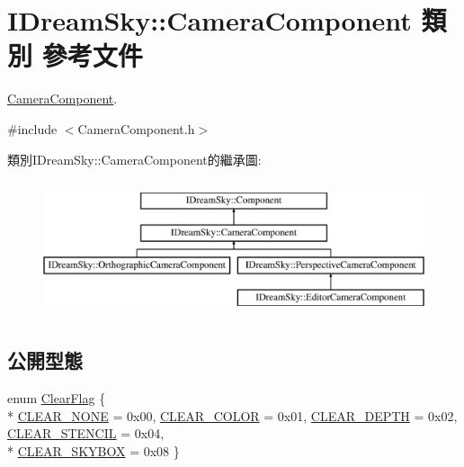 \hypertarget{class_i_dream_sky_1_1_camera_component}{}\section{I\+Dream\+Sky\+:\+:Camera\+Component 類別 參考文件}
\label{class_i_dream_sky_1_1_camera_component}


\hyperlink{class_i_dream_sky_1_1_camera_component}{Camera\+Component}.  




{\ttfamily \#include $<$Camera\+Component.\+h$>$}

類別\+I\+Dream\+Sky\+:\+:Camera\+Component的繼承圖\+:\begin{figure}[H]
\begin{center}
\leavevmode
\includegraphics[height=4.000000cm]{class_i_dream_sky_1_1_camera_component}
\end{center}
\end{figure}
\subsection*{公開型態}
\begin{DoxyCompactItemize}
\item 
enum \hyperlink{class_i_dream_sky_1_1_camera_component_ad5078bb9ef911389860f13234c35fc70}{Clear\+Flag} \{ \\*
\hyperlink{class_i_dream_sky_1_1_camera_component_ad5078bb9ef911389860f13234c35fc70a466fc0a2fd4571d4d8c9b37761f2d6c3}{C\+L\+E\+A\+R\+\_\+\+N\+O\+NE} = 0x00, 
\hyperlink{class_i_dream_sky_1_1_camera_component_ad5078bb9ef911389860f13234c35fc70aa7c0a8816a5fc94eaf9571808ba9af09}{C\+L\+E\+A\+R\+\_\+\+C\+O\+L\+OR} = 0x01, 
\hyperlink{class_i_dream_sky_1_1_camera_component_ad5078bb9ef911389860f13234c35fc70a7942b6e2e17139226d420a6e58ee4219}{C\+L\+E\+A\+R\+\_\+\+D\+E\+P\+TH} = 0x02, 
\hyperlink{class_i_dream_sky_1_1_camera_component_ad5078bb9ef911389860f13234c35fc70ac2cacba4456290b43dc83822d7606f0a}{C\+L\+E\+A\+R\+\_\+\+S\+T\+E\+N\+C\+IL} = 0x04, 
\\*
\hyperlink{class_i_dream_sky_1_1_camera_component_ad5078bb9ef911389860f13234c35fc70a8475f6b036f1ed93eef58cea18315480}{C\+L\+E\+A\+R\+\_\+\+S\+K\+Y\+B\+OX} = 0x08
 \}
\end{DoxyCompactItemize}
